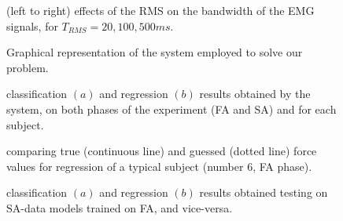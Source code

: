 \documentclass[10pt]{bmc_article}
\newenvironment{bmcformat}{\begin{raggedright}\baselineskip20pt\sloppy\setboolean{publ}{false}}{\end{raggedright}\baselineskip20pt\sloppy}
\begin{document}
\begin{bmcformat}
\begin{figure}[!ht] \centering
  \caption{(left to right) effects of the RMS on the bandwidth of the EMG
    signals, for $T_{RMS} = 20, 100, 500ms$.}
  \label{fig:RMSs}
\end{figure}

\begin{figure}[!ht] \centering
  \caption{Graphical representation of the system employed to solve our problem.}
  \label{fig:Algorithm}
\end{figure}

\begin{figure}[!ht] \centering
  \caption{classification $(a)$ and regression $(b)$ results obtained
    by the system, on both phases of the experiment (FA and SA) and
    for each subject.}
  \label{fig:results}
\end{figure}

\begin{figure}[!ht] \centering
  \caption{comparing true (continuous line) and guessed (dotted line) force values for regression of a
    typical subject (number $6$, FA phase).}
  \label{fig:examples}
\end{figure}

\begin{figure}[!ht] \centering
  \caption{classification $(a)$ and regression $(b)$ results obtained
    testing on SA-data models trained on FA, and vice-versa.}
  \label{fig:2on1}
\end{figure}


\end{bmcformat}
\end{document}
